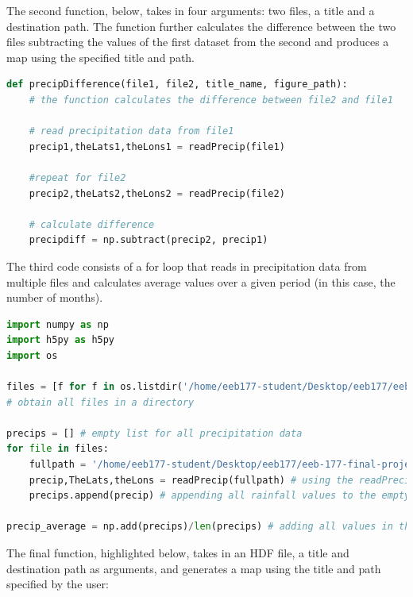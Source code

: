 \documentclass[12pt]{article}
\begin{document}
The second function, below, takes in four arguments: two files, a title and a destination path. The function further calculates the difference between the two files subtracting the values of the first dataset from the second and produces a map using the specified title and path.\\

\begin{lstlisting}[language=Python, caption=Calculating rainfall anomalies given two datasets]
def precipDifference(file1, file2, title_name, figure_path):
    # the function calculates the difference between file2 and file1
    
    # read precipitation data from file1
    precip1,theLats1,theLons1 = readPrecip(file1)
    
    #repeat for file2
    precip2,theLats2,theLons2 = readPrecip(file2)
    
    # calculate difference
    precipdiff = np.subtract(precip2, precip1)
\end{lstlisting}

The third code consists of a for loop that reads in precipitation data from multiple files and calculates average values over a given period (in this case, the number of months).\\

\begin{lstlisting}[language=Python, caption=Calculating rainfall anomalies given two datasets]
import numpy as np
import h5py as h5py
import os

files = [f for f in os.listdir('/home/eeb177-student/Desktop/eeb177/eeb-177-final-project/data/')]
# obtain all files in a directory

precips = [] # empty list for all precipitation data
for file in files:
    fullpath = '/home/eeb177-student/Desktop/eeb177/eeb-177-final-project/data/'+file # path to files
    precip,TheLats,theLons = readPrecip(fullpath) # using the readPrecip function defined earlier
    precips.append(precip) # appending all rainfall values to the empty list
    
precip_average = np.add(precips)/len(precips) # adding all values in the array and dividing by the length of the list to obtain long-term average
\end{lstlisting}

The final function, highlighted below, takes in an HDF file, a title and destination path as arguments, and generates a map using the title and path specified by the user:\\
\end{document}
